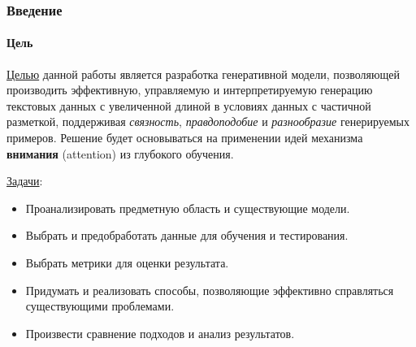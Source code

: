\documentclass[10pt]{beamer}
\begin{document}
\begin{frame}
\frametitle{Введение}
\framesubtitle{Цель}


\underline{Целью} данной работы является разработка генеративной модели, позволяющей производить эффективную, управляемую и интерпретируемую генерацию текстовых данных с увеличенной длиной в условиях данных с частичной разметкой, поддерживая \textit{связность}, \textit{правдоподобие} и \textit{разнообразие} генерируемых примеров. Решение будет основываться на применении идей механизма \textbf{внимания} (attention) из глубокого обучения.

\underline{Задачи}:
\begin{itemize}
    \item Проанализировать предметную область и существующие модели.
    \item Выбрать и предобработать данные для обучения и тестирования.
    \item Выбрать метрики для оценки результата.
    \item Придумать и реализовать способы, позволяющие эффективно справляться существующими проблемами.
    \item Произвести сравнение подходов и анализ результатов.
\end{itemize}


\end{frame}
\end{document}
